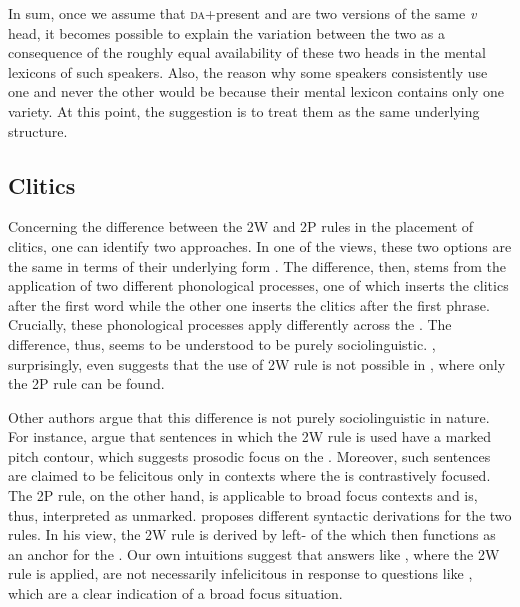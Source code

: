 \documentclass[output=paper,modfonts,newtxmath,hidelinks,]{langscibook}
\begin{document}
\noindent In sum, once we assume that \textsc{da}+present and  are two versions of the same \textit{v} head, it becomes possible to explain the variation between the two as a consequence of the roughly equal availability of these two heads in the mental lexicons of such speakers. Also, the reason why some speakers consistently use one and never the other would be because their mental lexicon contains only one variety. At this point, the suggestion is to treat them as the same underlying structure.

\subsection{Clitics}\label{7:s4.2}

Concerning the difference between the 2W and 2P rules in the placement of cli\-tics, one can identify two approaches. In one of the views, these two options are the same in terms of their underlying form \citep{Ronelle2006,Ronelle2008,Yu2008}. The difference, then, stems from the application of two different phonological processes, one of which inserts the clitics after the first word while the other one inserts the clitics after the first phrase. Crucially, these phonological processes apply differently across the . The difference, thus, seems to be understood to be purely sociolinguistic. \citet{Anderson2005}, surprisingly, even suggests that the use of 2W rule is not possible in , where only the 2P rule can be found.

Other authors argue that this difference is not purely sociolinguistic in nature. For instance, \citet{DiesingEtAl2009} argue that sentences in which the 2W rule is used have a marked pitch contour, which suggests prosodic focus on the . Moreover, such sentences are claimed to be felicitous only in contexts where the  is contrastively focused. The 2P rule, on the other hand, is applicable to broad focus contexts and is, thus, interpreted as unmarked. \citet{Boskovic2009} proposes different syntactic derivations for the two rules. In his view, the 2W rule is derived by left- of the  which then functions as an anchor for the . Our own intuitions suggest that answers like , where the 2W rule is applied, are not necessarily infelicitous in response to questions like , which are a clear indication of a broad focus situation.
\end{document}
